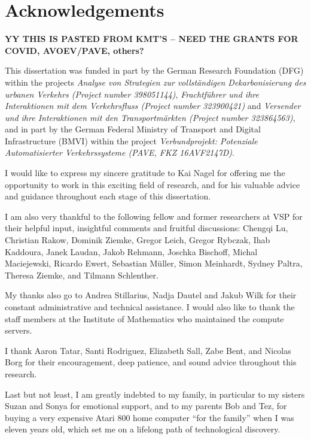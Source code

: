 
\thispagestyle{empty}

\chapter*{Acknowledgements}

\textbf{YY THIS IS PASTED FROM KMT'S -- NEED THE GRANTS FOR COVID, AVOEV/PAVE, others?}

This dissertation was funded in part by the German Research Foundation (DFG) within the projects
\emph{Analyse von Strategien zur vollständigen Dekarbonisierung des urbanen Verkehrs (Project number 398051144)},
\emph{Frachtführer und ihre Interaktionen mit dem Verkehrsfluss (Project number 323900421)} and
\emph{Versender und ihre Interaktionen mit den Transportmärkten (Project number 323864563)},
and in part by the German Federal Ministry of Transport and Digital Infrastructure (BMVI) within the project
\emph{Verbundprojekt: Potenziale Automatisierter Verkehrssysteme (PAVE, FKZ 16AVF2147D)}.

I would like to express my sincere gratitude to Kai Nagel for offering me the opportunity to work in this exciting field of research, and for his valuable advice and guidance throughout each stage of this dissertation.

I am also very thankful to the following fellow and former researchers at VSP for their helpful input, insightful comments and fruitful discussions:
Chengqi Lu,
Christian Rakow,
Dominik Ziemke,
Gregor Leich,
Gregor Rybczak,
Ihab Kaddoura,
Janek Laudan,
Jakob Rehmann,
Joschka Bischoff,
Michal Maciejewski,
Ricardo Ewert,
Sebastian Müller,
Simon Meinhardt,
Sydney Paltra,
Theresa Ziemke,
and Tilmann Schlenther.

My thanks also go to Andrea Stillarius, Nadja Dautel and Jakub Wilk for their constant administrative and technical assistance. I would also like to thank the staff members at the Institute of Mathematics who maintained the compute servers.

I thank Aaron Tatar, Santi Rodriguez, Elizabeth Sall, Zabe Bent, and Nicolas Borg for their encouragement, deep patience, and sound advice throughout this research.

Last but not least, I am greatly indebted to my family, in particular to my sisters Suzan and Sonya for emotional support, and to my parents Bob and Tez, for buying a very expensive Atari 800 home computer ``for the family'' when I was eleven years old, which set me on a lifelong path of technological discovery.

\newpage
